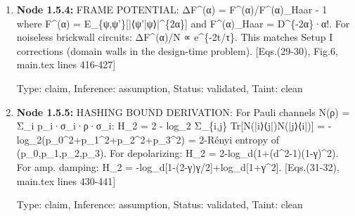 \documentclass{article}
\begin{document}
\begin{enumerate}
\begin{enumerate}
  Type: claim, Inference: assumption, Status: validated, Taint: clean

\item \textbf{Node 1.5.4:} FRAME POTENTIAL: ΔF\textasciicircum{}(α) = F\textasciicircum{}(α)/F\textasciicircum{}(α)\_Haar - 1 where F\textasciicircum{}(α) = E\_\{ψ,ψ'\}[|⟨ψ'|ψ⟩|\textasciicircum{}\{2α\}] and F\textasciicircum{}(α)\_Haar = D\textasciicircum{}\{-2α\}·α!. For noiseless brickwall circuits: ΔF\textasciicircum{}(α)/N ∝ e\textasciicircum{}\{-2t/τ\}. This matches Setup I corrections (domain walls in the design-time problem). [Eqs.(29-30), Fig.6, main.tex lines 416-427]

  Type: claim, Inference: assumption, Status: validated, Taint: clean

\item \textbf{Node 1.5.5:} HASHING BOUND DERIVATION: For Pauli channels N(ρ) = Σ\_i p\_i·σ\_i·ρ·σ\_i: H\_2 = 2 - log\_2 Σ\_\{i,j\} Tr[N(|i⟩⟨j|)N(|j⟩⟨i|)] = -log\_2(p\_0\textasciicircum{}2+p\_1\textasciicircum{}2+p\_2\textasciicircum{}2+p\_3\textasciicircum{}2) = 2-Rényi entropy of (p\_0,p\_1,p\_2,p\_3). For depolarizing: H\_2 = 2-log\_d(1+(d\textasciicircum{}2-1)(1-γ)\textasciicircum{}2). For amp. damping: H\_2 = -log\_d[1-(2-γ)γ/2]+log\_d[1+γ\textasciicircum{}2]. [Eqs.(31-32), main.tex lines 430-441]

  Type: claim, Inference: assumption, Status: validated, Taint: clean

\end{enumerate}
\end{enumerate}
\end{document}
